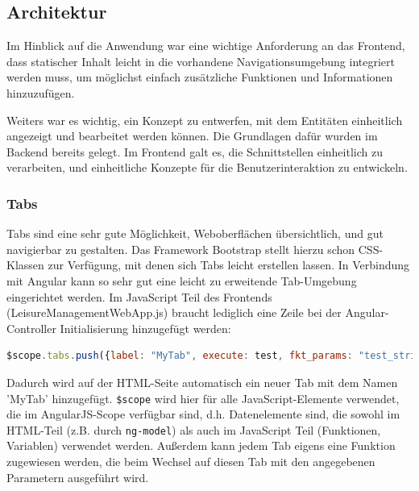 \subsection{Architektur}

Im Hinblick auf die Anwendung war eine wichtige Anforderung an das Frontend, dass statischer Inhalt leicht in die vorhandene Navigationsumgebung integriert werden muss, um möglichst einfach zusätzliche Funktionen und Informationen hinzuzufügen.

Weiters war es wichtig, ein Konzept zu entwerfen, mit dem Entitäten einheitlich angezeigt und bearbeitet werden können. Die Grundlagen dafür wurden im Backend bereits gelegt. Im Frontend galt es, die Schnittstellen einheitlich zu verarbeiten, und einheitliche Konzepte für die Benutzerinteraktion zu entwickeln.

\subsubsection{Tabs}
Tabs sind eine sehr gute Möglichkeit, Weboberflächen übersichtlich, und gut navigierbar zu gestalten. Das Framework Bootstrap stellt hierzu schon CSS-Klassen zur Verfügung, mit denen sich Tabs leicht erstellen lassen. In Verbindung mit Angular kann so sehr gut eine leicht zu erweitende Tab-Umgebung eingerichtet werden. Im JavaScript Teil des Frontends (LeisureManagementWebApp.js) braucht lediglich eine Zeile bei der Angular-Controller Initialisierung hinzugefügt werden:

\scriptsize
\begin{lstlisting}[language=Javascript]
$scope.tabs.push({label: "MyTab", execute: test, fkt_params: "test_string"});
\end{lstlisting}
\normalsize

Dadurch wird auf der HTML-Seite automatisch ein neuer Tab mit dem Namen 'MyTab' hinzugefügt. \verb|$scope| wird hier für alle JavaScript-Elemente verwendet, die im AngularJS-Scope verfügbar sind, d.h. Datenelemente sind, die sowohl im HTML-Teil (z.B. durch \verb|ng-model|) als auch im JavaScript Teil (Funktionen, Variablen) verwendet werden. Außerdem kann jedem Tab eigens eine Funktion zugewiesen werden, die beim Wechsel auf diesen Tab mit den angegebenen Parametern ausgeführt wird. 

